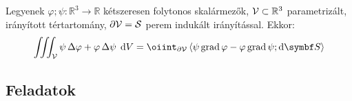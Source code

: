 \documentclass{szb-practice}
\begin{document}
\begin{theorem}
  Legyenek $\varphi; \psi: \mathbb R^3 \rightarrow \mathbb R$ kétszeresen
  folytonos skalármezők, $\mathcal{V} \subset \mathbb R^3$ parametrizált,
  irányított tértartomány, $\partial \mathcal{V} = \mathcal{S}$ perem indukált
  irányítással. Ekkor:
  $$
    \iiint_{\volimage}
    \psi \, \Delta \varphi + \varphi \, \Delta \psi
    \; \dd \volscalar
    =
    \oiint_{\partial \volimage}
    \scalar{\psi \grad \varphi - \varphi \grad \psi}{\dd \surfvec}
  $$
\end{theorem}

\clearpage
\subsection{Feladatok}
\end{document}
